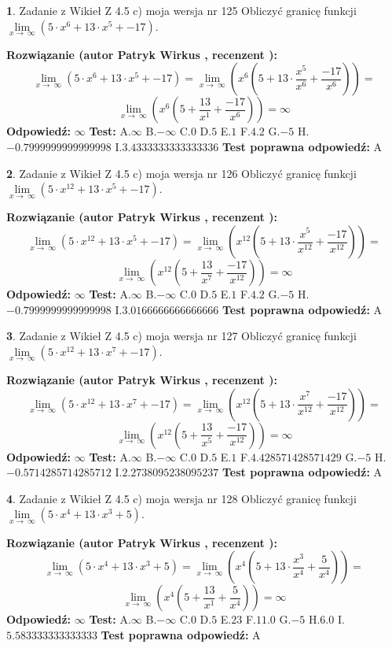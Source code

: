 \documentclass[12pt, a4paper]{article}
\theoremstyle{definition} %
\newtheorem{zad}{}
\newcommand{\zadStart}[1]{\begin{zad}#1\newline}
\newcommand{\zadStop}{\end{zad}}
\newcommand{\rozwStart}[2]{\noindent \textbf{Rozwiązanie (autor #1 , recenzent #2): }\newline}
\newcommand{\rozwStop}{\newline}
\newcommand{\odpStart}{\noindent \textbf{Odpowiedź:}\newline}
\newcommand{\odpStop}{\newline}
\newcommand{\testStart}{\noindent \textbf{Test:}\newline}
\newcommand{\testStop}{\newline}
\newcommand{\kluczStart}{\noindent \textbf{Test poprawna odpowiedź:}\newline}
\newcommand{\kluczStop}{\newline}
\begin{document}
\zadStart{Zadanie z Wikieł Z 4.5 c) moja wersja nr 125}
Obliczyć granicę funkcji  $\lim\limits_{x\to\ \infty}(5 \cdot x^{6}+13 \cdot x^{5}+-17)$.
\zadStop
\rozwStart{Patryk Wirkus}{}
$$\lim\limits_{x\to\ \infty}(5 \cdot x^{6}+13 \cdot x^{5}+-17) = \lim\limits_{x\to\ \infty}(x^{6}(5 +13 \cdot \frac{x^{5}}{x^{6}}+\frac{-17}{x^{6}})) =$$ $$\lim\limits_{x\to\ \infty}(x^{6}(5 +\frac{13}{x^{1}}+\frac{-17}{x^{6}})) =\infty$$
\rozwStop
\odpStart
$\infty$
\odpStop
\testStart
A.$\infty$ B.$-\infty$ C.$0$ D.$5$ E.$1$
F.$4.2$ G.$-5$
H.$-0.7999999999999998$
I.$3.4333333333333336$
\testStop
\kluczStart
A
\kluczStop



\zadStart{Zadanie z Wikieł Z 4.5 c) moja wersja nr 126}
Obliczyć granicę funkcji  $\lim\limits_{x\to\ \infty}(5 \cdot x^{12}+13 \cdot x^{5}+-17)$.
\zadStop
\rozwStart{Patryk Wirkus}{}
$$\lim\limits_{x\to\ \infty}(5 \cdot x^{12}+13 \cdot x^{5}+-17) = \lim\limits_{x\to\ \infty}(x^{12}(5 +13 \cdot \frac{x^{5}}{x^{12}}+\frac{-17}{x^{12}})) =$$ $$\lim\limits_{x\to\ \infty}(x^{12}(5 +\frac{13}{x^{7}}+\frac{-17}{x^{12}})) =\infty$$
\rozwStop
\odpStart
$\infty$
\odpStop
\testStart
A.$\infty$ B.$-\infty$ C.$0$ D.$5$ E.$1$
F.$4.2$ G.$-5$
H.$-0.7999999999999998$
I.$3.0166666666666666$
\testStop
\kluczStart
A
\kluczStop



\zadStart{Zadanie z Wikieł Z 4.5 c) moja wersja nr 127}
Obliczyć granicę funkcji  $\lim\limits_{x\to\ \infty}(5 \cdot x^{12}+13 \cdot x^{7}+-17)$.
\zadStop
\rozwStart{Patryk Wirkus}{}
$$\lim\limits_{x\to\ \infty}(5 \cdot x^{12}+13 \cdot x^{7}+-17) = \lim\limits_{x\to\ \infty}(x^{12}(5 +13 \cdot \frac{x^{7}}{x^{12}}+\frac{-17}{x^{12}})) =$$ $$\lim\limits_{x\to\ \infty}(x^{12}(5 +\frac{13}{x^{5}}+\frac{-17}{x^{12}})) =\infty$$
\rozwStop
\odpStart
$\infty$
\odpStop
\testStart
A.$\infty$ B.$-\infty$ C.$0$ D.$5$ E.$1$
F.$4.428571428571429$ G.$-5$
H.$-0.5714285714285712$
I.$2.2738095238095237$
\testStop
\kluczStart
A
\kluczStop



\zadStart{Zadanie z Wikieł Z 4.5 c) moja wersja nr 128}
Obliczyć granicę funkcji  $\lim\limits_{x\to\ \infty}(5 \cdot x^{4}+13 \cdot x^{3}+5)$.
\zadStop
\rozwStart{Patryk Wirkus}{}
$$\lim\limits_{x\to\ \infty}(5 \cdot x^{4}+13 \cdot x^{3}+5) = \lim\limits_{x\to\ \infty}(x^{4}(5 +13 \cdot \frac{x^{3}}{x^{4}}+\frac{5}{x^{4}})) =$$ $$\lim\limits_{x\to\ \infty}(x^{4}(5 +\frac{13}{x^{1}}+\frac{5}{x^{4}})) =\infty$$
\rozwStop
\odpStart
$\infty$
\odpStop
\testStart
A.$\infty$ B.$-\infty$ C.$0$ D.$5$ E.$23$
F.$11.0$ G.$-5$
H.$6.0$
I.$5.583333333333333$
\testStop
\kluczStart
A
\kluczStop
\end{document}
